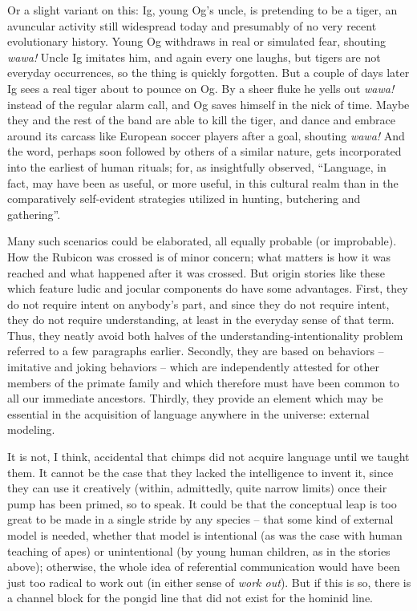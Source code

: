 Or a slight variant on this: Ig, young Og's uncle, is pretending to be a tiger, an avuncular activity still widespread today and presumably of no very recent evolutionary history. Young Og withdraws in real or simulated fear, shouting \textit{wawa!} Uncle Ig imitates him, and again every one laughs, but tigers are not everyday occurrences, so the thing is quickly forgotten. But a couple of days later Ig sees a real tiger about to pounce on Og. By a sheer fluke he yells out \textit{wawa!} instead of the regular alarm call, and Og saves himself in the nick of time. Maybe they and the rest of the band are able to kill the tiger, and dance and embrace around its carcass like European soccer players after a goal, shouting \textit{wawa!} And the word, perhaps soon followed by others of a similar nature, gets incorporated into the earliest of human rituals; for, as \citet{Marshack1976} insightfully observed, ``Language, in fact, may have been as useful, or more useful, in this cultural realm than in the comparatively self-evident strategies utilized in hunting, butchering and gathering''.


Many such scenarios could be elaborated, all equally probable (or improbable). How the Rubicon was crossed is of minor concern; what matters is how it was reached and what happened after it was crossed. But origin stories like these which feature ludic and jocular components do have some advantages. First, they do not require intent on anybody's part, and since they do not require intent, they do not require understanding, at least in the everyday sense of that term. Thus, they neatly avoid both halves of the understanding-intentionality problem referred to a few paragraphs earlier. Secondly, they are based on behaviors -- imitative and joking behaviors -- which are independently attested for other members of the primate family and which therefore must have been common to all our immediate ancestors. Thirdly, they provide an element which may be essential in the acquisition of lan\-guage anywhere in the universe: external modeling.

It is not, I think, accidental that chimps did not acquire language until we taught them. It cannot be the case that they lacked the intelligence to invent it, since they can use it creatively (within, admittedly, quite narrow limits) once their pump has been primed, so to speak. It could be that the conceptual leap is too great to be made in a single stride by any species -- that some kind of external model is needed, whether that model is intentional (as was the case with human teaching of apes) or unintentional (by young human children, as in the stories above); otherwise, the whole idea of referential communication would have been just too radical to work out (in either sense of \textit{work out}). But if this is so, there is a channel block for the pongid line that did not exist for the hominid line.

